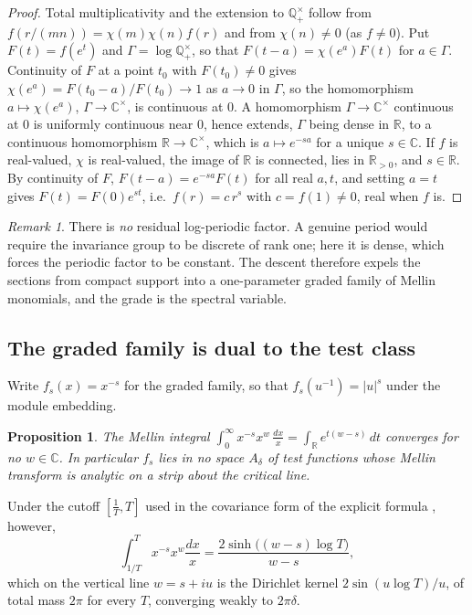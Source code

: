 \documentclass[11pt]{amsart}
\newtheorem{proposition}[theorem]{Proposition}
\theoremstyle{definition}
\theoremstyle{remark}
\newtheorem{remark}[theorem]{Remark}
\newcommand{\C}{\mathbb C}
\newcommand{\R}{\mathbb R}
\newcommand{\Q}{\mathbb Q}
\begin{document}
\begin{proof}
Total multiplicativity and the extension to $\Q^\times_+$ follow from
$f(r/(mn))=\chi(m)\chi(n)f(r)$ and from $\chi(n)\neq0$ (as $f\neq0$).  Put
$F(t)=f(e^t)$ and $\Gamma=\log\Q^\times_+$, so that $F(t-a)=\chi(e^a)F(t)$
for $a\in\Gamma$.  Continuity of $F$ at a point $t_0$ with
$F(t_0)\neq0$ gives $\chi(e^a)=F(t_0-a)/F(t_0)\to1$ as $a\to0$ in
$\Gamma$, so the homomorphism $a\mapsto\chi(e^a)$, $\Gamma\to\C^\times$, is
continuous at $0$.  A homomorphism $\Gamma\to\C^\times$ continuous at $0$
is uniformly continuous near $0$, hence extends, $\Gamma$ being dense in
$\R$, to a continuous homomorphism $\R\to\C^\times$, which is
$a\mapsto e^{-sa}$ for a unique $s\in\C$.  If $f$ is real-valued, $\chi$ is
real-valued, the image of $\R$ is connected, lies in $\R_{>0}$, and
$s\in\R$.  By continuity of $F$, $F(t-a)=e^{-sa}F(t)$ for all real $a,t$,
and setting $a=t$ gives $F(t)=F(0)e^{st}$, i.e.\ $f(r)=c\,r^{s}$ with
$c=f(1)\neq0$, real when $f$ is.
\end{proof}

\begin{remark}
There is \emph{no} residual log-periodic factor.  A genuine period would
require the invariance group to be discrete of rank one; here it is dense,
which forces the periodic factor to be constant.  The descent therefore
expels the sections from compact support into a one-parameter graded family
of Mellin monomials, and the grade is the spectral variable.
\end{remark}

\subsection{The graded family is dual to the test class}

Write $f_s(x)=x^{-s}$ for the graded family, so that $f_s(u^{-1})=|u|^{s}$
under the module embedding.

\begin{proposition}\label{prop:nomellin}
The Mellin integral $\int_0^\infty x^{-s}x^{w}\,\frac{dx}{x}
=\int_\R e^{t(w-s)}\,dt$ converges for no $w\in\C$.  In particular $f_s$
lies in no space $A_\delta$ of test functions whose Mellin transform is
analytic on a strip about the critical line.
\end{proposition}

Under the cutoff $[\tfrac1T,T]$ used in the covariance form of the explicit
formula \cite{BombieriLagarias,Lagarias2007}, however,
\begin{equation}
 \int_{1/T}^{T}x^{-s}x^{w}\frac{dx}{x}
 =\frac{2\sinh\big((w-s)\log T\big)}{w-s},
\end{equation}
which on the vertical line $w=s+iu$ is the Dirichlet kernel
$2\sin(u\log T)/u$, of total mass $2\pi$ for every $T$, converging weakly to
$2\pi\delta$.
\end{document}
